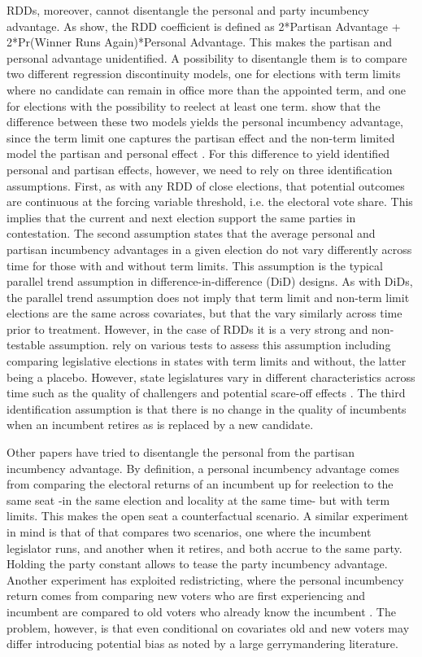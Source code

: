 \documentclass[12pt]{amsart}
\numberwithin{equation}{section}
\theoremstyle{definition}
\theoremstyle{definition}
\theoremstyle{definition}
\begin{document}
RDDs, moreover, cannot disentangle the personal and party incumbency advantage. As \citet{erikson_titiunik_2015} show, the RDD coefficient is defined as 2*Partisan Advantage + 2*Pr(Winner Runs Again)*Personal Advantage. This makes the partisan and personal advantage unidentified. A possibility to disentangle them is to compare two different regression discontinuity models, one for elections with term limits where no candidate can remain in office more than the appointed term, and one for elections with the possibility to reelect at least one term. \citet{fowler_hall_2014} show that the difference between these two models yields the personal incumbency advantage, since the term limit one captures the partisan effect and the non-term limited model the partisan and personal effect \citep{gelman_2011}. For this difference to yield identified personal and partisan effects, however, we need to rely on three identification assumptions. First, as with any RDD of close elections, that potential outcomes are continuous at the forcing variable threshold, i.e. the electoral vote share. This implies that the current and next election support the same parties in contestation. The second assumption states that the average personal and partisan incumbency advantages in a given election do not vary differently across time for those with and without term limits. This assumption is the typical parallel trend assumption in difference-in-difference (DiD) designs. As with DiDs, the parallel trend assumption does not imply that term limit and non-term limit elections are the same across covariates, but that the vary similarly across time prior to treatment. However, in the case of RDDs it is a very strong and non-testable assumption. \citet{fowler_hall_2014} rely on various tests to assess this assumption including comparing legislative elections in states with term limits and without, the latter being a placebo. However, state legislatures vary in different characteristics across time such as the quality of challengers and potential scare-off effects \citep{rogers_2014}. The third identification assumption is that there is no change in the quality of incumbents when an incumbent retires as is replaced by a new candidate. 


Other papers have tried to disentangle the personal from the partisan incumbency advantage. By definition, a personal incumbency advantage comes from comparing the electoral returns of an incumbent up for reelection to the same seat -in the same election and locality at the same time- but with term limits. This makes the open seat a counterfactual scenario. A similar experiment in mind is that of \citep{gelman_king_1990} that compares two scenarios, one where the incumbent legislator runs, and another when it retires, and both accrue to the same party. Holding the party constant allows to tease the party incumbency advantage. Another experiment has exploited redistricting, where the personal incumbency return comes from comparing  new voters who are first experiencing and incumbent are compared to old voters who already know the incumbent \citep{sekhon_titiunik_2012}. The problem, however, is that even conditional on covariates old and new voters may differ introducing potential bias as noted by a large gerrymandering literature. 
\end{document}
